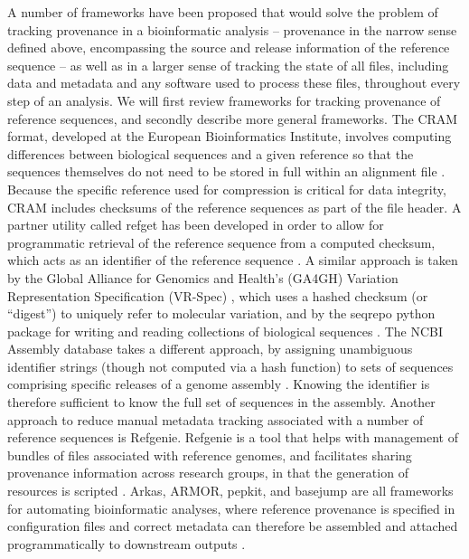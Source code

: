 \documentclass[12pt]{article} \usepackage[utf8]{inputenc}
\begin{document}
A number of frameworks have been proposed that would solve the problem
of tracking provenance in a bioinformatic analysis -- provenance in
the narrow sense defined above, encompassing the source and release
information of the reference sequence -- as well as in a larger sense
of tracking the state of all files, including data and metadata and
any software used to process these files, throughout every step of an
analysis. We will first review frameworks for tracking provenance of
reference sequences, and secondly describe more general
frameworks. The CRAM format, developed at the European Bioinformatics
Institute, involves computing differences between biological sequences
and a given reference so that the sequences themselves do not need to
be stored in full within an alignment file \citep{cram}. Because the
specific reference used for compression is critical for data
integrity, CRAM includes checksums of the reference sequences as part
of the file header. A partner utility called refget has been developed
in order to allow for programmatic retrieval of the reference sequence
from a computed checksum, which acts as an identifier of the reference
sequence \citep{refget}. A similar approach is taken by the Global
Alliance for Genomics and Health's (GA4GH) Variation Representation
Specification (VR-Spec) \citep{vr}, which uses a hashed checksum (or
``digest'') to uniquely refer to molecular variation, and by the
seqrepo python package for writing and reading collections of
biological sequences \citep{seqrepo}. The NCBI Assembly database takes
a different approach, by assigning unambiguous identifier strings
(though not computed via a hash function) to sets of sequences
comprising specific releases of a genome assembly
\citep{ncbi-assembly}. Knowing the identifier is therefore sufficient
to know the full set of sequences in the assembly.
Another approach to reduce manual metadata tracking associated with a
number of reference sequences is Refgenie. Refgenie is a tool that
helps with management of bundles of files associated with reference
genomes, and facilitates sharing provenance information across
research groups, in that the generation of resources is scripted
\citep{refgenie}. Arkas, ARMOR, pepkit, and basejump are all
frameworks for automating bioinformatic analyses, where reference
provenance is specified in configuration files and correct metadata
can therefore be assembled and attached programmatically to downstream
outputs \citep{arkas,Orjuelag2019,pepkit,basejump}.
\end{document}
